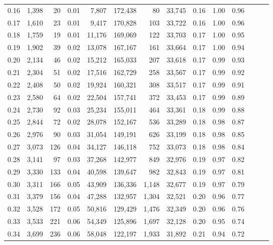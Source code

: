\begin{tabular}{rrrrrrrrrrrrrr}
0.16 &  1,398 &   20 &  0.01 &    7,807 &  172,438 &      80 &  33,745 &  0.16 &  1.00 &      0.96 \\
0.17 &  1,610 &   23 &  0.01 &    9,417 &  170,828 &     103 &  33,722 &  0.16 &  1.00 &      0.96 \\
0.18 &  1,759 &   19 &  0.01 &   11,176 &  169,069 &     122 &  33,703 &  0.17 &  1.00 &      0.95 \\
0.19 &  1,902 &   39 &  0.02 &   13,078 &  167,167 &     161 &  33,664 &  0.17 &  1.00 &      0.94 \\
0.20 &  2,134 &   46 &  0.02 &   15,212 &  165,033 &     207 &  33,618 &  0.17 &  0.99 &      0.93 \\
0.21 &  2,304 &   51 &  0.02 &   17,516 &  162,729 &     258 &  33,567 &  0.17 &  0.99 &      0.92 \\
0.22 &  2,408 &   50 &  0.02 &   19,924 &  160,321 &     308 &  33,517 &  0.17 &  0.99 &      0.91 \\
0.23 &  2,580 &   64 &  0.02 &   22,504 &  157,741 &     372 &  33,453 &  0.17 &  0.99 &      0.89 \\
0.24 &  2,730 &   92 &  0.03 &   25,234 &  155,011 &     464 &  33,361 &  0.18 &  0.99 &      0.88 \\
0.25 &  2,844 &   72 &  0.02 &   28,078 &  152,167 &     536 &  33,289 &  0.18 &  0.98 &      0.87 \\
0.26 &  2,976 &   90 &  0.03 &   31,054 &  149,191 &     626 &  33,199 &  0.18 &  0.98 &      0.85 \\
0.27 &  3,073 &  126 &  0.04 &   34,127 &  146,118 &     752 &  33,073 &  0.18 &  0.98 &      0.84 \\
0.28 &  3,141 &   97 &  0.03 &   37,268 &  142,977 &     849 &  32,976 &  0.19 &  0.97 &      0.82 \\
0.29 &  3,330 &  133 &  0.04 &   40,598 &  139,647 &     982 &  32,843 &  0.19 &  0.97 &      0.81 \\
0.30 &  3,311 &  166 &  0.05 &   43,909 &  136,336 &   1,148 &  32,677 &  0.19 &  0.97 &      0.79 \\
0.31 &  3,379 &  156 &  0.04 &   47,288 &  132,957 &   1,304 &  32,521 &  0.20 &  0.96 &      0.77 \\
0.32 &  3,528 &  172 &  0.05 &   50,816 &  129,429 &   1,476 &  32,349 &  0.20 &  0.96 &      0.76 \\
0.33 &  3,533 &  221 &  0.06 &   54,349 &  125,896 &   1,697 &  32,128 &  0.20 &  0.95 &      0.74 \\
0.34 &  3,699 &  236 &  0.06 &   58,048 &  122,197 &   1,933 &  31,892 &  0.21 &  0.94 &      0.72 \\

\end{tabular}
